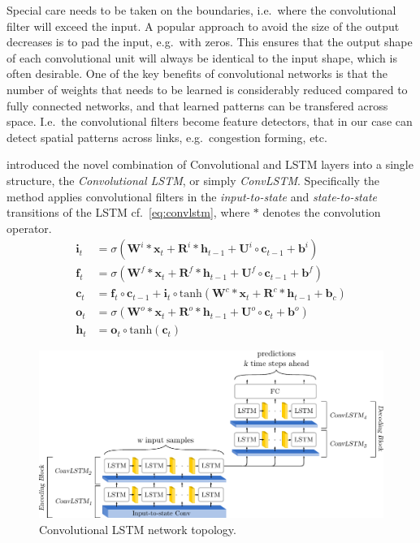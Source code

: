\documentclass[preprint,11pt,5p,twocolumn]{elsarticle}
\newcommand{\matr}[1]{\mathbf{#1}}
\begin{document}
Special care needs to be taken on the boundaries, i.e.\ where the convolutional filter will exceed the input. A popular approach to avoid the size of the output decreases is to pad the input, e.g.\ with zeros. This ensures that the output shape of each convolutional unit will always be identical to the input shape, which is often desirable. One of the key benefits of convolutional networks is that the number of weights that needs to be learned is considerably reduced compared to fully connected networks, and that learned patterns can be transfered across space. I.e.\ the convolutional filters become feature detectors, that in our case can detect spatial patterns across links, e.g.\ congestion forming, etc.   

\citet{ConvLSTM} introduced the novel combination of Convolutional and LSTM layers into a single structure, the \emph{Convolutional LSTM}, or simply \emph{ConvLSTM}. Specifically the method applies convolutional filters in the \emph{input-to-state} and \emph{state-to-state} transitions of the LSTM cf.~\cref{eq:convlstm}, where $*$ denotes the convolution operator.
\begin{equation}
\begin{aligned}
  \matr{i}_t &= \sigma \left( \matr{W}^i * \matr{x}_t + \matr{R}^i * \matr{h}_{t-1} + \matr{U}^i \circ \matr{c}_{t-1} + \matr{b}^i \right) \\
  \matr{f}_t &= \sigma \left( \matr{W}^f * \matr{x}_t + \matr{R}^f * \matr{h}_{t-1} + \matr{U}^f \circ \matr{c}_{t-1} + \matr{b}^f \right) \\
  \matr{c}_t &= \matr{f}_t \circ \matr{c}_{t-1} + \matr{i}_t \circ \mathrm{tanh} \left( \matr{W}^c * \matr{x}_t + \matr{R}^c * \matr{h}_{t-1} + \matr{b}_c \right) \\
  \matr{o}_t &= \sigma \left( \matr{W}^\mathit{o} * \matr{x}_t + \matr{R}^\mathit{o} * \matr{h}_{t-1} + \matr{U}^\mathit{o} \circ \matr{c}_{t} + \matr{b}^o \right) \\
  \matr{h}_t &= \matr{o}_t \circ \mathrm{tanh} \left( \matr{c}_t \right)
\end{aligned}
\label{eq:convlstm}
\end{equation}
\vspace{.5em}

\begin{figure}[!t]
  \centering
  \includegraphics[scale=.75]{drawings/conv_lstm.pdf}
  \caption{Convolutional LSTM network topology.}
  \label{fig:ConvLSTM}
\end{figure}
\end{document}
